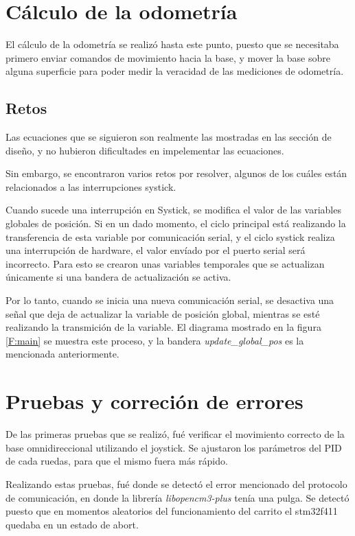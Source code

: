 \section{Cálculo de la odometría}

El cálculo de la odometría se realizó hasta este punto, puesto que se necesitaba primero enviar comandos de movimiento hacia la base, y mover la base sobre alguna superficie para poder medir la veracidad de las mediciones de odometría.

\subsection{Retos}

Las ecuaciones que se siguieron son realmente las mostradas en las sección de diseño, y no hubieron dificultades en impelementar las ecuaciones.

Sin embargo, se encontraron varios retos por resolver, algunos de los cuáles están relacionados a las interrupciones systick.

Cuando sucede una interrupción en Systick, se modifica el valor de las variables globales de posición. Si en un dado momento, el ciclo principal está realizando la transferencia de esta variable por comunicación serial, y el ciclo systick realiza una interrupción de hardware, el valor envíado por el puerto serial será incorrecto. Para esto se crearon unas variables temporales que se actualizan únicamente si una bandera de actualización se activa.

Por lo tanto, cuando se inicia una nueva comunicación serial, se desactiva una señal que deja de actualizar la variable de posición global, mientras se esté realizando la transmición de la variable. El diagrama mostrado en la figura \ref{F:main} se muestra este proceso, y la bandera \textit{update\_global\_pos} es la mencionada anteriormente.

\section{Pruebas y correción de errores}

De las primeras pruebas que se realizó, fué verificar el movimiento correcto de la base omnidireccional utilizando el joystick. Se ajustaron los parámetros del PID de cada ruedas, para que el mismo fuera más rápido.

Realizando estas pruebas, fué donde se detectó el error mencionado del protocolo de comunicación, en donde la librería \textit{libopencm3-plus} tenía una pulga. Se detectó puesto que en momentos aleatorios del funcionamiento del carrito el stm32f411 quedaba en un estado de abort.

